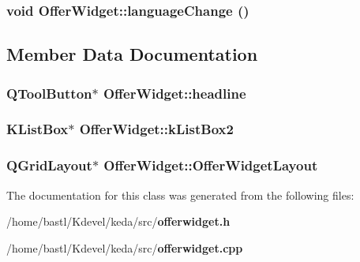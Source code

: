 \subsubsection{\setlength{\rightskip}{0pt plus 5cm}void Offer\-Widget::language\-Change ()\hspace{0.3cm}{\tt  [protected, virtual, slot]}}\label{classOfferWidget_1182bf5637039731d24c9b1e622b4179}




\subsection{Member Data Documentation}
\subsubsection{\setlength{\rightskip}{0pt plus 5cm}QTool\-Button$\ast$ {\bf Offer\-Widget::headline}}\label{classOfferWidget_ef983058688ff58732b0fe2b8779fc0a}


\subsubsection{\setlength{\rightskip}{0pt plus 5cm}KList\-Box$\ast$ {\bf Offer\-Widget::k\-List\-Box2}}\label{classOfferWidget_72fe198c330c3a2e98f05b0c96a66417}


\subsubsection{\setlength{\rightskip}{0pt plus 5cm}QGrid\-Layout$\ast$ {\bf Offer\-Widget::Offer\-Widget\-Layout}\hspace{0.3cm}{\tt  [protected]}}\label{classOfferWidget_b2472c04e9f52a0aec4c3c318085fa45}




The documentation for this class was generated from the following files:\begin{CompactItemize}
\item 
/home/bastl/Kdevel/keda/src/{\bf offerwidget.h}\item 
/home/bastl/Kdevel/keda/src/{\bf offerwidget.cpp}\end{CompactItemize}
